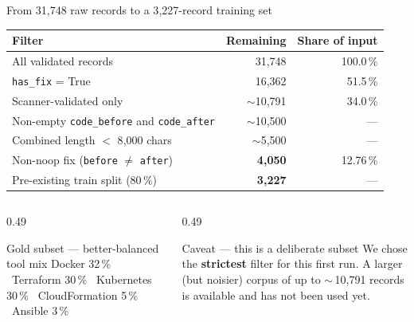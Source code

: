\documentclass[aspectratio=169, 10pt]{beamer}
\begin{document}
\begin{frame}{From 31{,}748 raw records to a 3{,}227-record training set}
  \centering\small
  \begin{tabular}{lrr}
    \toprule
    \textbf{Filter} & \textbf{Remaining} & \textbf{Share of input} \\
    \midrule
    All validated records                                            & 31{,}748          & 100.0\,\% \\
    \texttt{has\_fix} = True                                         & 16{,}362          & 51.5\,\% \\
    Scanner-validated only                                           & $\sim$10{,}791    & 34.0\,\% \\
    Non-empty \texttt{code\_before} and \texttt{code\_after}         & $\sim$10{,}500    & ---      \\
    Combined length $<$ 8{,}000 chars                                & $\sim$5{,}500     & ---      \\
    Non-noop fix (\texttt{before} $\neq$ \texttt{after})             & \textbf{4{,}050}  & 12.76\,\% \\
    Pre-existing train split (80\,\%)                                & \textbf{3{,}227}  & ---      \\
    \bottomrule
  \end{tabular}

  \vspace{0.6em}
  \begin{columns}[T]
    \begin{column}{0.49\textwidth}
      \begin{exampleblock}{Gold subset --- better-balanced tool mix}
        \scriptsize
        Docker 32\,\% \textbullet\ Terraform 30\,\% \textbullet\
        Kubernetes 30\,\% \textbullet\ CloudFormation 5\,\% \textbullet\
        Ansible 3\,\%
      \end{exampleblock}
    \end{column}
    \begin{column}{0.49\textwidth}
      \begin{alertblock}{Caveat --- this is a deliberate subset}
        \scriptsize
        We chose the \textbf{strictest} filter for this first run.
        A larger (but noisier) corpus of up to $\sim$\,10{,}791 records
        is available and has not been used yet.
      \end{alertblock}
    \end{column}
  \end{columns}
\end{frame}
\end{document}

